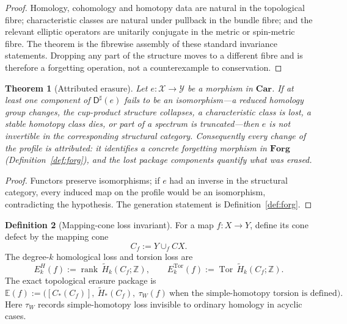 \documentclass[11pt,a4paper]{article}
\newtheorem{theorem}{Theorem}[section]
\theoremstyle{definition}
\newtheorem{definition}[theorem]{Definition}
\theoremstyle{remark}
\newcommand{\Z}{\mathbb{Z}}
\newcommand{\Dsharp}{\mathsf{D}^{\sharp}}
\newcommand{\Car}{\mathbf{Car}}
\newcommand{\Forg}{\mathbf{Forg}}
\begin{document}
\begin{proof}
Homology, cohomology and homotopy data are natural in the topological fibre; characteristic
classes are natural under pullback in the bundle fibre; and the relevant elliptic operators are
unitarily conjugate in the metric or spin-metric fibre.  The theorem is the fibrewise assembly
of these standard invariance statements.  Dropping any part of the structure moves to a
different fibre and is therefore a forgetting operation, not a counterexample to conservation.
\end{proof}

\begin{theorem}[Attributed erasure]
\label{thm:erasure}
Let $e:\mathcal X\to\mathcal Y$ be a morphism in $\Car$.  If at least one component of
$\Dsharp(e)$ fails to be an isomorphism---a reduced homology group changes, the cup-product
structure collapses, a characteristic class is lost, a stable homotopy class dies, or part of a
spectrum is truncated---then $e$ is not invertible in the corresponding structural category.
Consequently every change of the profile is \emph{attributed}: it identifies a concrete
forgetting morphism in $\Forg$ (Definition~\ref{def:forg}), and the lost package components
quantify what was erased.
\end{theorem}

\begin{proof}
Functors preserve isomorphisms; if $e$ had an inverse in the structural category, every induced
map on the profile would be an isomorphism, contradicting the hypothesis.  The generation
statement is Definition~\ref{def:forg}.

\end{proof}

\begin{definition}[Mapping-cone loss invariant]
\label{def:cone-loss}
For a map $f:X\to Y$, define its cone defect by the mapping cone
\[
C_f:=Y\cup_f CX.
\]
The degree-$k$ homological loss and torsion loss are
\[
E_k^{H}(f):=\operatorname{rank}\,\widetilde H_k(C_f;\Z),\qquad
E_k^{\mathrm{Tor}}(f):=\operatorname{Tor}\,\widetilde H_k(C_f;\Z).
\]
The exact topological erasure package is
\[
\mathbb E(f):=\big([C_*(C_f)],\ \widetilde H_*(C_f),\
\tau_W(f)\ \text{when the simple-homotopy torsion is defined}\big).
\]
Here $\tau_W$ records simple-homotopy loss invisible to ordinary homology in acyclic cases.
\end{definition}
\end{document}
